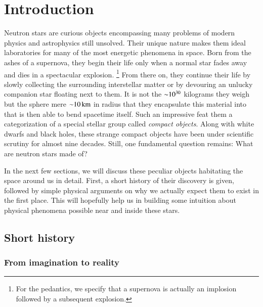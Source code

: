 \chapter{Introduction} 

Neutron stars are curious objects encompassing many problems of modern physics and astrophysics still unsolved.
Their unique nature makes them ideal laboratories for many of the most energetic phenomena in space.
Born from the ashes of a supernova, they begin their life only when a normal star fades away and dies in a spectacular explosion.%
\footnote{ For the pedantics, we specify that a supernova is actually an implosion followed by a subsequent explosion.}
From there on, they continue their life by slowly collecting the surrounding interstellar matter or by devouring an unlucky companion star floating next to them.
It is not the $\mathord{\sim} 10^{30}$ kilograms they weigh but the sphere mere $\mathord{\sim} 10 \, \mathrm{km}$ in radius that they encapsulate this material into that is then able to bend spacetime itself.
Such an impressive feat  them a categorization of a special stellar group called \textit{compact objects}.
Along with white dwarfs and black holes, these strange compact objects have been under scientific scrutiny for almost nine decades.
Still, one fundamental question remains:
What are neutron stars made of?

In the next few sections, we will discuss these peculiar objects habitating the space around us in detail.
First, a short history of their discovery is given, followed by simple physical arguments on why we actually expect them to exist in the first place.
This will hopefully help us in building some intuition about physical phenomena possible near and inside these stars.


\section{Short history}
\subsection{From imagination to reality}

